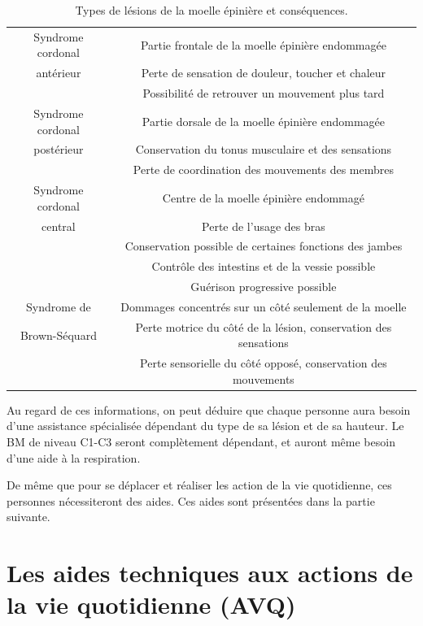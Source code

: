 \documentclass[letterpaper, twoside, 12pt, memoire, creativecommons, hyperref]{thETS}
\begin{document}
\begin{table}[ht]
	\caption{Types de lésions de la moelle épinière et conséquences.}
		\begin{tabular}{|c|c|}
		\hline
	    	 	Syndrome cordonal & Partie frontale de la moelle épinière endommagée\\
	    	 	antérieur & Perte de sensation de douleur, toucher et chaleur\\
	    	 	& Possibilité de retrouver un mouvement plus tard\\
	    \hline
	    	 	Syndrome cordonal & Partie dorsale de la moelle épinière endommagée\\
	    	 	postérieur & Conservation du tonus musculaire et des sensations \\
	    	 	& Perte de coordination des mouvements des membres\\
	    \hline
	    		Syndrome cordonal & Centre de la moelle épinière endommagé\\
	    		central & Perte de l'usage des bras\\
	    		& Conservation possible de certaines fonctions des jambes\\
	    		& Contrôle des intestins et de la vessie possible \\
	    		& Guérison progressive possible\\
	    	\hline
	    		Syndrome de & Dommages concentrés sur un côté seulement de la moelle \\
	    		Brown-Séquard& Perte motrice du côté de la lésion, conservation des sensations\\
	    		& Perte sensorielle du côté opposé, conservation des mouvements\\
	    \hline
		\end{tabular}
	\label{tab:typelesion}
\end{table}

Au regard de ces informations, on peut déduire que chaque personne aura besoin d'une assistance spécialisée dépendant du type de sa lésion et de sa hauteur. Le BM de niveau C1-C3 seront complètement dépendant, et auront même besoin d'une aide à la respiration. 

De même que pour se déplacer et réaliser les action de la vie quotidienne, ces personnes nécessiteront des aides. Ces aides sont présentées dans la partie suivante.

\section{Les aides techniques aux actions de la vie quotidienne (AVQ)}
\end{document}
